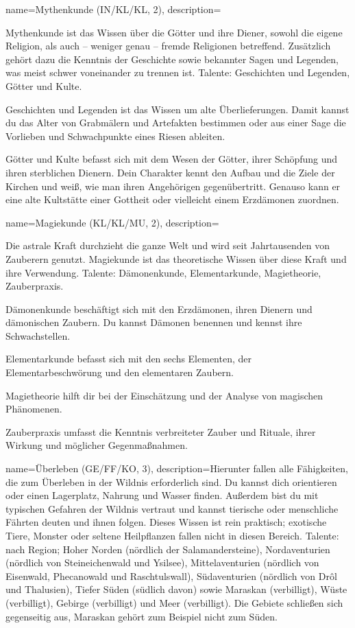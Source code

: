 {
    name={Mythenkunde (IN/KL/KL, 2)},
    description={Mythenkunde ist das Wissen über die Götter und ihre Diener, sowohl die eigene Religion, als auch – weniger genau – fremde Religionen betreffend. Zusätzlich gehört dazu die Kenntnis der Geschichte sowie bekannter Sagen und Legenden, was meist schwer voneinander zu trennen ist. Talente: Geschichten und Legenden, Götter und Kulte.
\begin{description}
\item Geschichten und Legenden ist das Wissen um alte Überlieferungen. Damit kannst du das Alter von Grabmälern und Artefakten bestimmen oder aus einer Sage die Vorlieben und Schwachpunkte eines Riesen ableiten.
\item Götter und Kulte befasst sich mit dem Wesen der Götter, ihrer Schöpfung und ihren sterblichen Dienern. Dein Charakter kennt den Aufbau und die Ziele der Kirchen und weiß, wie man ihren Angehörigen gegenübertritt. Genauso kann er eine alte Kultstätte einer Gottheit oder vielleicht einem Erzdämonen zuordnen.
\end{description}}}

{
    name={Magiekunde (KL/KL/MU, 2)},
    description={Die astrale Kraft durchzieht die ganze Welt und wird seit Jahrtausenden von Zauberern genutzt. Magiekunde ist das theoretische Wissen über diese Kraft und ihre Verwendung. Talente: Dämonenkunde, Elementarkunde, Magietheorie, Zauberpraxis.
\begin{description}
\item Dämonenkunde beschäftigt sich mit den Erzdämonen, ihren Dienern und dämonischen Zaubern. Du kannst Dämonen benennen und kennst ihre Schwachstellen.
\item Elementarkunde befasst sich mit den sechs Elementen, der Elementarbeschwörung und den elementaren Zaubern.
\item Magietheorie hilft dir bei der Einschätzung und der Analyse von magischen Phänomenen.
\item Zauberpraxis umfasst die Kenntnis verbreiteter Zauber und Rituale, ihrer Wirkung und möglicher Gegenmaßnahmen.
\end{description}}}

{
    name={Überleben (GE/FF/KO, 3)},
    description={Hierunter fallen alle Fähigkeiten, die zum Überleben in der Wildnis erforderlich sind. Du kannst dich orientieren oder einen Lagerplatz, Nahrung und Wasser finden. Außerdem bist du mit typischen Gefahren der Wildnis vertraut und kannst tierische oder menschliche Fährten deuten und ihnen folgen. Dieses Wissen ist rein praktisch; exotische Tiere, Monster oder seltene Heilpflanzen fallen nicht in diesen Bereich. Talente: nach Region; Hoher Norden (nördlich der Salamandersteine), Nordaventurien (nördlich von Steineichenwald und Ysilsee), Mittelaventurien (nördlich von Eisenwald, Phecanowald und Raschtulswall), Südaventurien (nördlich von Drôl und Thalusien), Tiefer Süden (südlich davon) sowie Maraskan (verbilligt), Wüste (verbilligt), Gebirge (verbilligt) und Meer (verbilligt). Die Gebiete schließen sich gegenseitig aus, Maraskan gehört zum Beispiel nicht zum Süden.}}

